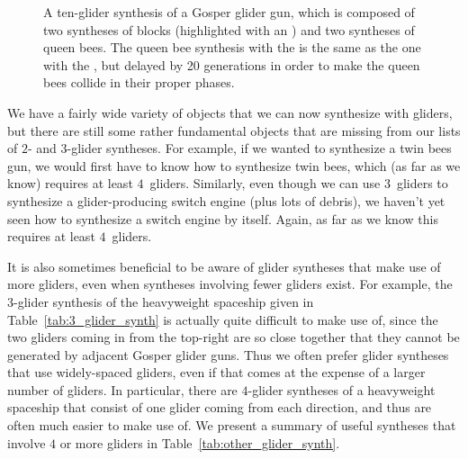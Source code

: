 \begin{figure}[!ht]
	\centering{}
	\caption{A ten-glider synthesis of a Gosper glider gun, which is composed of two syntheses of blocks (highlighted with an ) and two syntheses of queen bees. The queen bee synthesis with the  is the same as the one with the , but delayed by 20 generations in order to make the queen bees collide in their proper phases.}\label{fig:gosper_glider_synth}
\end{figure}

We have a fairly wide variety of objects that we can now synthesize with gliders, but there are still some rather fundamental objects that are missing from our lists of $2$- and $3$-glider syntheses. For example, if we wanted to synthesize a twin bees gun, we would first have to know how to synthesize twin bees, which (as far as we know) requires at least $4$~gliders. Similarly, even though we can use $3$~gliders to synthesize a glider-producing switch engine (plus lots of debris), we haven't yet seen how to synthesize a switch engine by itself. Again, as far as we know this requires at least $4$~gliders.

It is also sometimes beneficial to be aware of glider syntheses that make use of more gliders, even when syntheses involving fewer gliders exist. For example, the $3$-glider synthesis of the heavyweight spaceship given in Table~\ref{tab:3_glider_synth} is actually quite difficult to make use of, since the two gliders coming in from the top-right are so close together that they cannot be generated by adjacent Gosper glider guns. Thus we often prefer glider syntheses that use widely-spaced gliders, even if that comes at the expense of a larger number of gliders. In particular, there are $4$-glider syntheses of a heavyweight spaceship that consist of one glider coming from each direction, and thus are often much easier to make use of. We present a summary of useful syntheses that involve $4$ or more gliders in Table~\ref{tab:other_glider_synth}.

